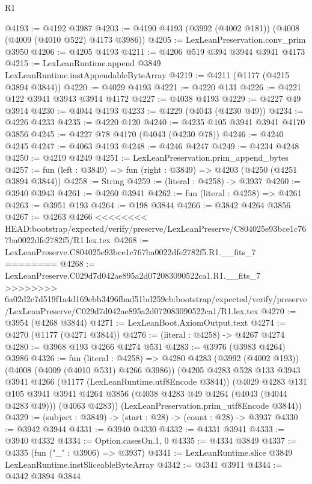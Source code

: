 \begin{lexlean}{R1}
\begin{coremodule}
{{{{{{{{{{{{{{{{{{{{{{{{{{{{{{{{{{{{{{{{{{{{{{{{{{{{{{{{{{{{{{{{{{{{{{{{{{{{{{{{{{{{{{{{{{{{{{{{{{{{{{{{{{{{{{{{{{{{{{{{{{{{{{{{{{{{{{{{{{{{{{{{{{{{{{{{{{{{{{{{{{{{{{{{{{{{{{{{{{{{{{{{{{@4193 := @4192 @3987
@4203 := @4190 @4193 (@3992 (@4002 @181)) (@4008 (@4009 (@4010 @522) @4173 @3986))
@4205 := LexLeanPreservation.conv_prim @3950
@4206 := @4205 @4193
@4211 := @4206 @519 @394 @3944 @3941 @4173
@4215 := LexLeanRuntime.append @3849 LexLeanRuntime.instAppendableByteArray
@4219 := @4211 (@1177 (@4215 @3894 @3844))
@4220 := @4029 @4193
@4221 := @4220 @131
@4226 := @4221 @122 @3941 @3943 @3914 @4172
@4227 := @4038 @4193
@4229 := @4227 @49 @3914
@4230 := @4044 @4193
@4233 := @4229 (@4043 (@4230 @49))
@4234 := @4226 @4233
@4235 := @4220 @120
@4240 := @4235 @105 @3941 @3941 @4170 @3856
@4245 := @4227 @78 @4170 (@4043 (@4230 @78))
@4246 := @4240 @4245
@4247 := @4063 @4193
@4248 := @4246 @4247
@4249 := @4234 @4248
@4250 := @4219 @4249
@4251 := LexLeanPreservation.prim_append_bytes
@4257 := fun (left : @3849) => fun (right : @3849) => @4203 (@4250 (@4251 @3894 @3844))
@4258 := String
@4259 := (literal : @4258) -> @3937
@4260 := @3940 @3943
@4261 := @4260 @3941
@4262 := fun (literal : @4258) => @4261
@4263 := @3951 @193
@4264 := @198 @3844
@4266 := @3842 @4264 @3856
@4267 := @4263 @4266
<<<<<<<< HEAD:bootstrap/expected/verify/preserve/LexLeanPreserve/C804025e93bce1c767ba0022dfe2782f5/R1.lex.tex
@4268 := LexLeanPreserve.C804025e93bce1c767ba0022dfe2782f5.R1.__fits_7
========
@4268 := LexLeanPreserve.C029d7d042ae895a2d072083090522ca1.R1.__fits_7
>>>>>>>> 6a02d2c7d519f1a4d169ebb3496fbad51bd259cb:bootstrap/expected/verify/preserve/LexLeanPreserve/C029d7d042ae895a2d072083090522ca1/R1.lex.tex
@4270 := @3954 (@4268 @3844)
@4271 := LexLeanBoot.AxiomOutput.text
@4274 := @4270 (@1177 (@4271 @3844))
@4276 := (literal : @4258) -> @4267 @4274
@4280 := @3968 @193 @4266 @4274 @531
@4283 := @3976 (@3983 @4264) @3986
@4326 := fun (literal : @4258) =>
  @4280
    @4283
    (@3992 (@4002 @193))
    (@4008 (@4009 (@4010 @531) @4266 @3986))
    (@4205
      @4283
      @528
      @133
      @3943
      @3941
      @4266
      (@1177 (LexLeanRuntime.utf8Encode @3844))
      (@4029
        @4283
        @131
        @105
        @3941
        @3941
        @4264
        @3856
        (@4038 @4283 @49 @4264 (@4043 (@4044 @4283 @49)))
        (@4063 @4283))
      (LexLeanPreservation.prim_utf8Encode @3844))
@4329 := (subject : @3849) -> (start : @28) -> (count : @28) -> @3937
@4330 := @3942 @3944
@4331 := @3940 @4330
@4332 := @4331 @3941
@4333 := @3940 @4332
@4334 := Option.casesOn.{1, 0}
@4335 := @4334 @3849
@4337 := @4335 (fun ("_" : @3906) => @3937)
@4341 := LexLeanRuntime.slice @3849 LexLeanRuntime.instSliceableByteArray
@4342 := @4341 @3911
@4344 := @4342 @3894 @3844
}}}}}}}}}}}}}}}}}}}}}}}}}}}}}}}}}}}}}}}}}}}}}}}}}}}}}}}}}}}}}}}}}}}}}}}}}}}}}}}}}}}}}}}}}}}}}}}}}}}}}}}}}}}}}}}}}}}}}}}}}}}}}}}}}}}}}}}}}}}}}}}}}}}}}}}}}}}}}}}}}}}}}}}}}}}}}}}}}}}}}}}}}}
\end{coremodule}
\end{lexlean}
